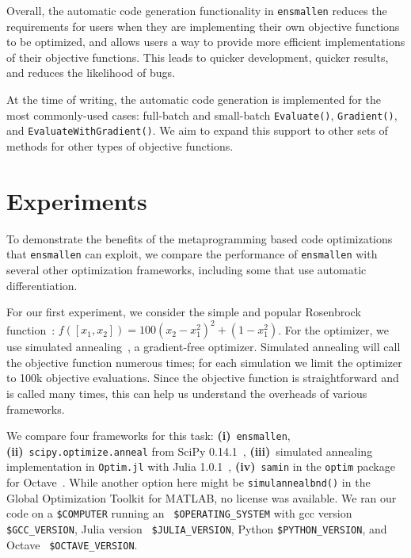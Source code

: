 \documentclass{article}
\begin{document}
Overall, the automatic code generation functionality in {\tt ensmallen}
reduces the requirements for users
when they are implementing their own objective functions to be optimized,
and allows users a way to provide more efficient implementations of their
objective functions.
This leads to quicker development, quicker results, and reduces the likelihood of bugs.

At the time of writing, the automatic code generation
is implemented for the most commonly-used cases:
full-batch and small-batch \texttt{\small Evaluate()}, \texttt{\small Gradient()},
and \texttt{\small EvaluateWithGradient()}.  We aim to expand this support to other
sets of methods for other types of objective functions.


\vspace*{-0.3em}
\section{Experiments}
\vspace*{-0.5em}

To demonstrate the benefits of the metaprogramming based code optimizations
that {\tt ensmallen} can exploit,
we compare the performance of {\tt ensmallen} with several other
optimization frameworks, including some that use automatic differentiation.

For our first experiment, we consider the simple and popular Rosenbrock
function~\cite{Rosenbrock1960}: $f([x_1, x_2]) = 100 (x_2 - x_1^2)^2 + (1 -
x_1^2)$.  For the optimizer, we use simulated
annealing~\cite{kirkpatrick1983optimization}, a gradient-free optimizer.
Simulated annealing will call the objective function numerous times; for each
simulation we limit the optimizer to 100k objective evaluations.  Since the
objective function is straightforward and is called many times, this can help us
understand the overheads of various frameworks.

We compare four frameworks for this task:
{\bf (i)}~{\tt ensmallen},
{\bf (ii)}~\texttt{\small scipy.optimize.anneal} from SciPy 0.14.1~\cite{jones2014scipy},
{\bf (iii)}~simulated annealing implementation in \texttt{\small Optim.jl} with Julia 1.0.1~\cite{mogensen2018optim},
{\bf (iv)}~\texttt{\small samin} in the \texttt{\small optim} package for Octave~\cite{octave}.
While another option here might be \texttt{\small simulannealbnd()} 
in the Global Optimization Toolkit for MATLAB,
no license was available.
We ran our code on a {\tt \$COMPUTER} running an {\tt
\$OPERATING\_SYSTEM} with gcc version {\tt \$GCC\_VERSION}, Julia version {\tt
\$JULIA\_VERSION}, Python {\tt \$PYTHON\_VERSION}, and Octave {\tt
\$OCTAVE\_VERSION}.
\end{document}
